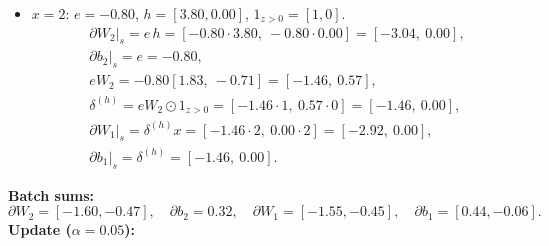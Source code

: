 \documentclass[11pt]{article}
\begin{document}
\begin{itemize}
\begin{align*}
&\partial b_2\big|_s = e = 0.75,\\
&eW_2 = 0.75[1.83,\ -0.71] = [1.37,\ -0.53],\\
&\delta^{(h)} = eW_2 \odot 1_{z>0} = [1.37\cdot1,\ -0.53\cdot0] = [1.37,\ 0.00],\\
&\partial W_1\big|_s = \delta^{(h)} x = [1.37\cdot1,\ 0.00\cdot1] = [1.37,\ 0.00],\\
&\partial b_1\big|_s = \delta^{(h)} = [1.37,\ 0.00].
\end{align*}
\item $x=2$: $e=-0.80$, $h=[3.80, 0.00]$, $1_{z>0}=[1,0]$.
\begin{align*}
&\partial W_2\big|_s = e\,h = [-0.80\cdot3.80,\ -0.80\cdot0.00] = [-3.04,\ 0.00],\\
&\partial b_2\big|_s = e = -0.80,\\
&eW_2 = -0.80[1.83,\ -0.71] = [-1.46,\ 0.57],\\
&\delta^{(h)} = eW_2 \odot 1_{z>0} = [-1.46\cdot1,\ 0.57\cdot0] = [-1.46,\ 0.00],\\
&\partial W_1\big|_s = \delta^{(h)} x = [-1.46\cdot2,\ 0.00\cdot2] = [-2.92,\ 0.00],\\
&\partial b_1\big|_s = \delta^{(h)} = [-1.46,\ 0.00].
\end{align*}
\end{itemize}
\noindent\textbf{Batch sums:}
\[
\partial W_2=[-1.60, -0.47],\quad \partial b_2=0.32,\quad \partial W_1=[-1.55, -0.45],\quad \partial b_1=[0.44, -0.06].
\]
\noindent\textbf{Update ($\alpha=0.05$):}
\end{document}
